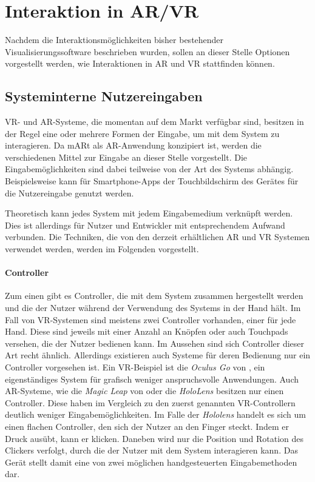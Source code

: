 \section{Interaktion in AR/VR}	
\label{VRInteraktion}							 %

Nachdem die Interaktionsmöglichkeiten bisher bestehender Visualisierungssoftware beschrieben wurden, sollen an dieser Stelle Optionen vorgestellt werden, wie Interaktionen in AR und VR stattfinden können. 

\subsection{Systeminterne Nutzereingaben}

VR- und AR-Systeme, die momentan auf dem Markt verfügbar sind, besitzen in der Regel  eine oder mehrere Formen der Eingabe, um mit dem System zu interagieren. Da mARt als AR-Anwendung konzipiert ist, werden die verschiedenen Mittel zur Eingabe an dieser Stelle vorgestellt.
Die Eingabemöglichkeiten sind dabei teilweise von der Art des Systems abhängig. 
Beispielsweise kann für Smartphone-Apps der Touchbildschirm des Gerätes für die Nutzereingabe genutzt werden. 

Theoretisch kann jedes System mit jedem Eingabemedium verknüpft werden. Dies ist allerdings für Nutzer und Entwickler mit entsprechendem Aufwand verbunden. Die Techniken, die von den derzeit erhältlichen AR und VR Systemen verwendet werden, werden im Folgenden vorgestellt.

\paragraph{Controller}
Zum einen gibt es Controller, die mit dem System zusammen hergestellt werden und die der Nutzer während der Verwendung des Systems in der Hand hält. Im Fall von VR-Systemen sind meistens zwei Controller vorhanden, einer für jede Hand. Diese sind jeweils mit einer Anzahl an Knöpfen oder auch Touchpads versehen, die der Nutzer bedienen kann. Im Aussehen sind sich Controller dieser Art recht ähnlich. %
Allerdings existieren auch Systeme für deren Bedienung nur ein Controller vorgesehen ist. Ein VR-Beispiel ist die \textit{Oculus Go} von \cite{oculus}, ein eigenständiges System für grafisch weniger anspruchsvolle Anwendungen. 
Auch AR-Systeme, wie die \textit{Magic Leap} von \cite{magicLeap} oder die \textit{HoloLens} besitzen nur einen Controller. Diese haben im Vergleich zu den zuerst genannten VR-Controllern deutlich weniger Eingabemöglichkeiten. Im Falle der \textit{Hololens} handelt es sich um einen flachen Controller, den sich der Nutzer an den Finger steckt. Indem er Druck ausübt, kann er klicken. Daneben wird nur die Position und Rotation des Clickers verfolgt, durch die der Nutzer mit dem System interagieren kann. Das Gerät stellt damit eine von zwei möglichen handgesteuerten Eingabemethoden dar. 

